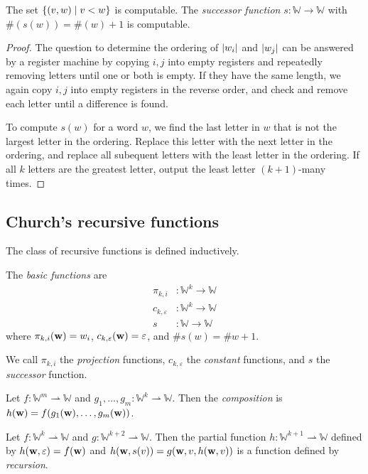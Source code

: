 \begin{theorem}
	The set \( \qty{(v,w) \mid v < w} \) is computable.
	The \emph{successor function} \( s \colon \mathbb W \to \mathbb W \) with \( \#(s(w)) = \#(w)+1 \) is computable.
\end{theorem}
\begin{proof}
	The question to determine the ordering of \( \abs{w_i} \) and \( \abs{w_j} \) can be answered by a register machine by copying \( i, j \) into empty registers and repeatedly removing letters until one or both is empty.
	If they have the same length, we again copy \( i, j \) into empty registers in the reverse order, and check and remove each letter until a difference is found.

	To compute \( s(w) \) for a word \( w \), we find the last letter in \( w \) that is not the largest letter in the ordering.
	Replace this letter with the next letter in the ordering, and replace all subequent letters with the least letter in the ordering.
	If all \( k \) letters are the greatest letter, output the least letter \( (k + 1) \)-many times.
\end{proof}

\subsection{Church's recursive functions}
The class of recursive functions is defined inductively.
\begin{definition}
	The \emph{basic functions} are
	\begin{align*}
		\pi_{k,i} &\colon \mathbb W^k \to \mathbb W \\
		c_{k,\varepsilon} &\colon \mathbb W^k \to \mathbb W \\
		s &\colon \mathbb W \to \mathbb W
	\end{align*}
	where \( \pi_{k,i}(\vb w) = w_i \), \( c_{k,\varepsilon}(\vb w) = \varepsilon \), and \( \# s(w) = \# w + 1 \).
\end{definition}
We call \( \pi_{k,i} \) the \emph{projection} functions, \( c_{k,\varepsilon} \) the \emph{constant} functions, and \( s \) the \emph{successor} function.

Let \( f \colon \mathbb W^m \rightharpoonup \mathbb W \) and \( g_1, \dots, g_m \colon \mathbb W^k \rightharpoonup \mathbb W \).
Then the \emph{composition} is \( h(\vb w) = f(g_1(\vb w), \dots, g_m(\vb w)) \).

Let \( f \colon \mathbb W^k \rightharpoonup \mathbb W \) and \( g \colon \mathbb W^{k+2} \rightharpoonup \mathbb W \).
Then the partial function \( h \colon \mathbb W^{k+1} \rightharpoonup \mathbb W \) defined by \( h(\vb w, \varepsilon) = f(\vb w) \) and \( h(\vb w, s(v)) = g(\vb w, v, h(\vb w, v)) \) is a function defined by \emph{recursion}.

